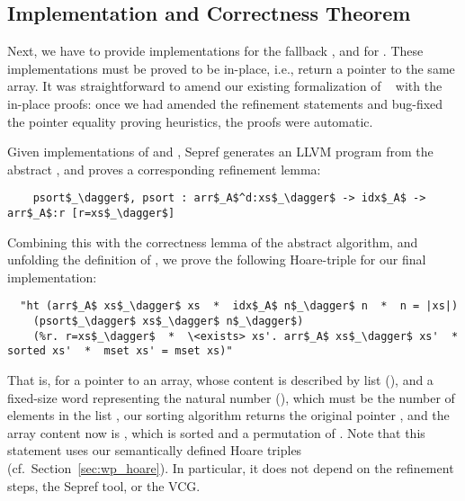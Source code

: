 \documentclass[sn-mathphys,Numbered]{sn-jnl}
\theoremstyle{thmstyleone}%
\theoremstyle{definition}%
\theoremstyle{thmstylethree}%
\begin{document}
  \subsection{Implementation and Correctness Theorem}\label{sec:impl_corr}
  Next, we have to provide implementations for the fallback , and for .
  These implementations must be proved to be in-place, i.e., return a pointer to the same array.
  It was straightforward to amend our existing formalization of ~\cite{La20} with the in-place proofs:
  once we had amended the refinement statements and bug-fixed the pointer equality proving heuristics,
  the proofs were automatic.

  Given implementations of  and , Sepref
  generates an LLVM program  from the abstract , and proves a corresponding refinement lemma:
  \begin{lstlisting}
    psort$_\dagger$, psort : arr$_A$^d:xs$_\dagger$ -> idx$_A$ -> arr$_A$:r [r=xs$_\dagger$]
  \end{lstlisting}
  Combining this with the correctness lemma of the abstract  algorithm, and unfolding the definition of ,
  we prove the following Hoare-triple for our final implementation:
  \begin{lstlisting}
  "ht (arr$_A$ xs$_\dagger$ xs  *  idx$_A$ n$_\dagger$ n  *  n = |xs|)
    (psort$_\dagger$ xs$_\dagger$ n$_\dagger$)
    (%r. r=xs$_\dagger$  *  \<exists> xs'. arr$_A$ xs$_\dagger$ xs'  *  sorted xs'  *  mset xs' = mset xs)"
  \end{lstlisting}
  That is, for a pointer  to an array, whose content is described by list  (), and a fixed-size word  representing the natural number  (),
  which must be the number of elements in the list , our sorting algorithm returns the original pointer , and the array content now is , which is sorted and a permutation of .
  Note that this statement uses our semantically defined Hoare triples (cf.\ Section~\ref{sec:wp_hoare}).
  In particular, it does not depend on the refinement steps, the Sepref tool, or the VCG.
\end{document}

